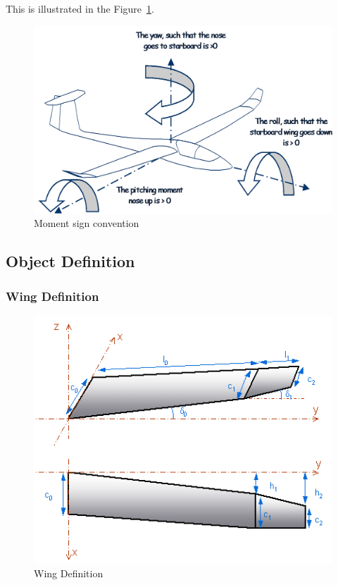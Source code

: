 \documentclass[a4paper,twoside,12pt,dvips]{article}
\begin{document}
This is illustrated in the Figure~\ref{fig:moment_sign_convention}.

\begin{figure}[htbp]
  \includegraphics[width=0.8\linewidth]{img-06}\centering 
  \caption{Moment sign convention}
  \label{fig:moment_sign_convention}
\end{figure}

\subsection{Object Definition}

\subsubsection{Wing Definition}

\begin{figure}[htbp]
  \includegraphics[width=0.8\linewidth]{img-07}\centering 
  \caption{Wing Definition}
  \label{fig:wing_definition}
\end{figure}
\end{document}

